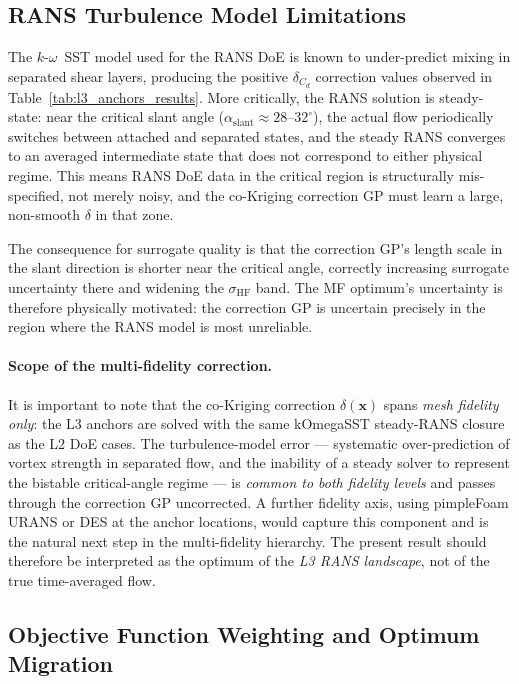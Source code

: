 \subsection{RANS Turbulence Model Limitations}
\label{sec:rans_limits}

The $k$-$\omega$~SST model used for the RANS DoE is known to under-predict mixing in separated shear layers, producing the positive $\delta_{C_d}$ correction values observed in Table~\ref{tab:l3_anchors_results}. More critically, the RANS solution is steady-state: near the critical slant angle ($\alpha_\mathrm{slant} \approx 28$--$32^\circ$), the actual flow periodically switches between attached and separated states, and the steady RANS converges to an averaged intermediate state that does not correspond to either physical regime. This means RANS DoE data in the critical region is structurally mis-specified, not merely noisy, and the co-Kriging correction GP must learn a large, non-smooth $\delta$ in that zone.

The consequence for surrogate quality is that the correction GP's length scale in the slant direction is shorter near the critical angle, correctly increasing surrogate uncertainty there and widening the $\sigma_\mathrm{HF}$ band. The MF optimum's uncertainty is therefore physically motivated: the correction GP is uncertain precisely in the region where the RANS model is most unreliable.

\paragraph{Scope of the multi-fidelity correction.} It is important to note that the co-Kriging correction $\delta(\mathbf{x})$ spans \emph{mesh fidelity only}: the L3 anchors are solved with the same kOmegaSST steady-RANS closure as the L2 DoE cases. The turbulence-model error — systematic over-prediction of vortex strength in separated flow, and the inability of a steady solver to represent the bistable critical-angle regime — is \emph{common to both fidelity levels} and passes through the correction GP uncorrected. A further fidelity axis, using pimpleFoam URANS or DES at the anchor locations, would capture this component and is the natural next step in the multi-fidelity hierarchy. The present result should therefore be interpreted as the optimum of the \emph{L3 RANS landscape}, not of the true time-averaged flow.

\subsection{Objective Function Weighting and Optimum Migration}
\label{sec:lambda_sensitivity}

